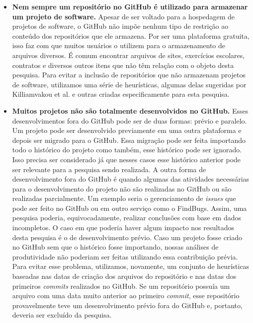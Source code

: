 \begin{itemize}
\item \textbf{Nem sempre um repositório no GitHub é utilizado para armazenar um projeto de software.} Apesar de ser voltado para a hospedagem de projetos de software, o GitHub não impõe nenhum tipo de restrição ao conteúdo dos repositórios que ele armazena. Por ser uma plataforma gratuita, isso faz com que muitos usuários o utilizem para o armazenamento de arquivos diversos.  É comum encontrar arquivos de sites, exercícios escolares, contratos e diversos outros itens que não têm relação com o objeto desta pesquisa. Para evitar a inclusão de repositórios que não armazenam projetos de software, utilizamos uma série de heurísticas, algumas delas sugeridas por Killiamvakou et al.\cite{kalliamvakou2014promises} e outras criadas especificamente para esta pesquisa. 
\item \textbf{Muitos projetos não são totalmente desenvolvidos no GitHub.} Esses desenvolvimentos fora do GitHub pode ser de duas formas: prévio e paralelo. Um projeto pode ser desenvolvido previamente em uma outra plataforma e depois ser migrado para o GitHub. Essa migração pode ser feita importando todo o histórico do projeto como também, esse histórico pode ser ignorado. Isso precisa ser considerado já que nesses casos esse histórico anterior pode ser relevante para a pesquisa sendo realizada.  A outra forma de desenvolvimento fora do GitHub é quando algumas das atividades necessárias para o desenvolvimento do projeto não são realizadas no GitHub ou são realizadas parcialmente. Um exemplo seria o gerenciamento de \textit{issues} que pode ser feito no GitHub ou em outro serviço como o FindBugs\cite{ayewah2007using}. Assim, uma pesquisa poderia, equivocadamente, realizar conclusões com base em dados incompletos. O caso em que poderia haver algum impacto nos resultados desta pesquisa é o de desenvolvimento prévio. Caso um projeto fosse criado no GitHub sem que o histórico fosse importando, nossas análises de produtividade não poderiam ser feitas utilizando essa contribuição prévia. Para evitar esse problema, utilizamos, novamente, um conjunto de heurísticas baseadas nas datas de criação dos arquivos do repositório e nas datas dos primeiros \textit{commits} realizados no GitHub. Se um repositório possuía um arquivo com uma data muito anterior ao primeiro \textit{commit}, esse repositório provavelmente teve um desenvolvimento prévio fora do GitHub e, portanto, deveria ser excluído da pesquisa.
\end{itemize}





